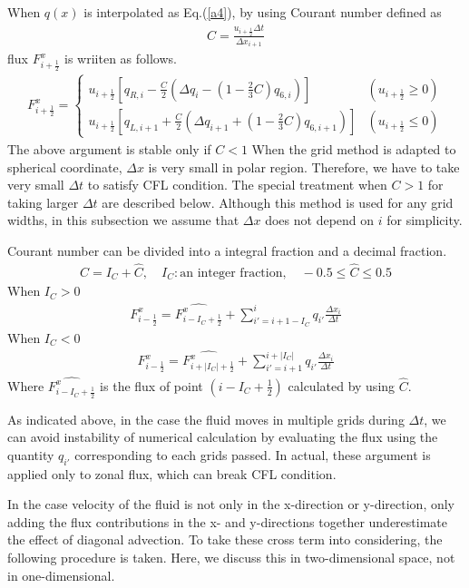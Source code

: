 When \(q(x)\) is interpolated as Eq.(\ref{a4}), by using Courant number defined as \begin{eqnarray}C=\frac{u_{i+\frac{1}{2}}\Delta t}{\Delta x_{i+1}}\end{eqnarray} flux \(F^{x}_{i+\frac{1}{2}}\) is wriiten as
follows. \begin{eqnarray}F^{x}_{i+\frac{1}{2}}=\begin{cases}u_{i+\frac{1}{2}}[q_{R,i}-\frac{C}{2}(\Delta q_{i}-(1-\frac{2}{3}C)q_{6,i})] & (u_{i+\frac{1}{2}}\ge0)\\
  u_{i+\frac{1}{2}}[q_{L,i+1}+\frac{C}{2}(\Delta q_{i+1}+(1-\frac{2}{3}C)q_{6,i+1})] & (u_{i+\frac{1}{2}}\leq0)
  \end{cases}\end{eqnarray} The above argument is stable only if \(C<1\) When the grid method is adapted to spherical coordinate, \(\Delta x\) is very small in polar region. Therefore, we have to take very small
\(\Delta t\) to satisfy CFL condition. The special treatment when \(C>1\) for taking larger \(\Delta t\) are described below. Although this method is used for any grid widths, in this subsection we
assume that \(\Delta x\) does not depend on \(i\) for simplicity.

Courant number can be divided into a integral fraction and a decimal fraction. \begin{eqnarray}C=I_{C}+\hat{C},\quad I_{C}: \text{an integer fraction},\quad -0.5\le \hat{C} \le 0.5\end{eqnarray} When \(I_{C}>0\)
\begin{eqnarray}F^{x}_{i-\frac{1}{2}}=\hat{F^{x}_{i-I_{C}+\frac{1}{2}}}+\sum^{i}_{i'=i+1-I_{C}} q_{i'} \frac{\Delta x_{i}}{\Delta t}\end{eqnarray} When \(I_{C}<0\)
\begin{eqnarray}F^{x}_{i-\frac{1}{2}}=\hat{F^{x}_{i+|I_{C}|+\frac{1}{2}}}+\sum^{i+|I_{C}|}_{i'=i+1} q_{i'} \frac{\Delta x_{i}}{\Delta t}\end{eqnarray} Where \(\hat{F^{x}_{i-I_{C}+\frac{1}{2}}}\) is the flux of point
\((i-I_{C}+\frac{1}{2})\) calculated by using \(\hat{C}\).

As indicated above, in the case the fluid moves in multiple grids during \(\Delta t\), we can avoid instability of numerical calculation by evaluating the flux using the quantity \(q_{i'}\)
corresponding to each grids passed. In actual, these argument is applied only to zonal flux, which can break CFL condition.

In the case velocity of the fluid is not only in the x-direction or y-direction, only adding the flux contributions in the x- and y-directions together underestimate the effect of diagonal advection.
To take these cross term into considering, the following procedure is taken. Here, we discuss this in two-dimensional space, not in one-dimensional.

